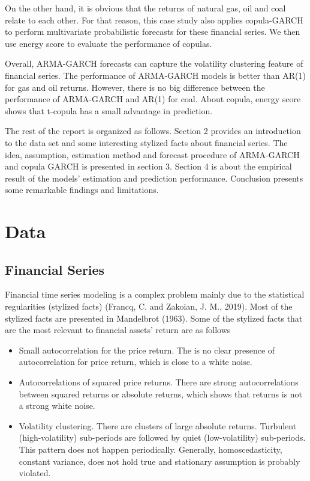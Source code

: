 \documentclass[12pt,a4paper]{article}
\numberwithin{equation}{section}
\begin{document}
On the other hand, it is obvious that the returns of natural gas, oil and coal relate to each other. For that reason, this case study also applies copula-GARCH to perform multivariate probabilistic forecasts for these financial series. We then use energy score to evaluate the performance of copulas.

Overall, ARMA-GARCH forecasts can capture the volatility clustering feature of financial series. The performance of ARMA-GARCH models is better than AR(1) for gas and oil returns. However, there is no big difference between the performance of ARMA-GARCH and AR(1) for coal. About copula, energy score shows that t-copula has a small advantage in prediction.  


 The rest of the report is organized as follows. Section 2 provides an introduction to the data set and some interesting stylized facts about financial series. The idea, assumption, estimation method and forecast procedure of ARMA-GARCH and copula GARCH is presented in section 3. Section 4 is about the empirical result of the models' estimation and prediction performance. Conclusion presents some remarkable findings and limitations.

\section{Data}
\subsection{Financial Series}
Financial time series modeling is a complex problem mainly due to the statistical regularities (stylized facts) (Francq, C. and Zakoian, J. M., 2019). Most of the stylized facts are presented in Mandelbrot (1963). Some of the stylized facts that are the most relevant to financial assets' return are as follows

\begin{itemize}
\item Small autocorrelation for the price return. The is no clear presence of autocorrelation for price return, which is close to a white noise. 

\item Autocorrelations of squared price returns. There are strong autocorrelations between squared returns or absolute returns, which shows that returns is not a strong white noise.

\item Volatility clustering. There are clusters of large absolute returns. Turbulent (high-volatility) sub-periods are followed by quiet (low-volatility) sub-periods. This pattern does not happen periodically. Generally, homoscedasticity, constant variance, does not hold true and stationary assumption is probably violated.

\end{itemize}
\end{document}
